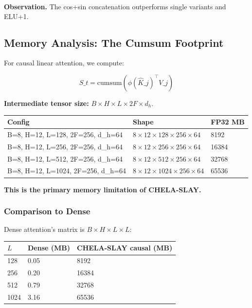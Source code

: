 \textbf{Observation.} The cos+sin concatenation outperforms single variants and 
ELU+1.

\subsection{Memory Analysis: The Cumsum Footprint}

For causal linear attention, we compute:

\[
S\_t = \text{cumsum}(\phi(\hat{K}\_j)^\top V\_j)
\]

\textbf{Intermediate tensor size:} $B \times H \times L \times 2F \times d_h$.

\begin{table}[H]
\centering
\small
\begin{tabular}{lll}
\toprule
\textbf{Config} & \textbf{Shape} & \textbf{FP32 MB} \\
\midrule
B=8, H=12, L=128, 2F=256, d\_h=64 & $8 \times 12 \times 128 \times 256 \times 64$ & 8192 \\
B=8, H=12, L=256, 2F=256, d\_h=64 & $8 \times 12 \times 256 \times 256 \times 64$ & 16384 \\
B=8, H=12, L=512, 2F=256, d\_h=64 & $8 \times 12 \times 512 \times 256 \times 64$ & 32768 \\
B=8, H=12, L=1024, 2F=256, d\_h=64 & $8 \times 12 \times 1024 \times 256 \times 64$ & 65536 \\
\bottomrule
\end{tabular}
\end{table}

\textbf{This is the primary memory limitation of CHELA-SLAY.}

\subsubsection{Comparison to Dense}

Dense attention's matrix is $B \times H \times L \times L$:

\begin{table}[H]
\centering
\small
\begin{tabular}{lll}
\toprule
\textbf{$L$} & \textbf{Dense (MB)} & \textbf{CHELA-SLAY causal (MB)} \\
\midrule
128 & 0.05 & 8192 \\
256 & 0.20 & 16384 \\
512 & 0.79 & 32768 \\
1024 & 3.16 & 65536 \\
\bottomrule
\end{tabular}
\end{table}

